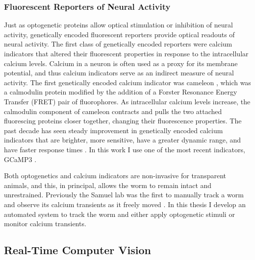 \subsubsection{Fluorescent Reporters of Neural Activity}
Just as optogenetic proteins allow optical stimulation or inhibition of neural activity,  genetically encoded fluorescent reporters provide optical readouts of neural activity.  The first class of genetically encoded reporters were calcium indicators that altered their fluorescent properties in response to the intracellular calcium levels. Calcium in a neuron is often used as a proxy for its membrane potential, and thus calcium indicators serve as an indirect measure of neural activity.   The first genetically encoded calcium indicator was cameleon \citep{miyawaki_fluorescent_1997}, which was a calmodulin protein modified by the addition of a Forster Resonance Energy Transfer (FRET) pair of fluorophores. As intracellular calcium levels increase, the calmodulin component of  cameleon contracts and pulls the two attached fluorescing proteins closer together, changing their fluorescence properties. The past decade has seen  steady improvement in genetically encoded calcium indicators that are brighter, more sensitive, have a greater dynamic range, and have faster response times \citep{miyawaki_innovations_2005,mank_genetically_2008,yamada_quantitative_2011}. In this work I use one of the most recent indicators, GCaMP3 \citep{tian_imaging_2009}.
 

Both optogenetics and calcium indicators are non-invasive for transparent animals, and this, in principal, allows the worm to remain intact and unrestrained. Previously the Samuel lab was the first to manually track a worm and observe its calcium transients as it freely moved \citep{clark_temporal_2007}. In this thesis I develop an automated system to track the worm and either apply optogenetic stimuli or monitor calcium transients.



\subsection{Real-Time Computer Vision}

